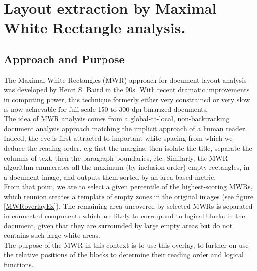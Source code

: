 \documentclass{report}
\begin{document}
\chapter{Layout extraction by Maximal White Rectangle analysis.}

\section{Approach and Purpose}
The Maximal White Rectangles (MWR) approach for document layout analysis was developed by Henri S. Baird in the 90s. With recent dramatic
improvements in computing power, this technique formerly either very constrained or very slow is now achievable for full scale 150 to
300 dpi binarized documents.\\

The idea of MWR analysis comes from a global-to-local, non-backtracking document analysis approach matching the implicit approach of a human
reader. Indeed, the eye is first attracted to important white spacing from which we deduce the reading order. e.g first the margins, then isolate
the title, separate the columns of text, then the paragraph boundaries, etc. Similarly, the MWR algorithm enumerates all the maximum (by inclusion
order) empty rectangles, in a document image, and outputs them sorted by an area-based metric.\\

From that point, we are to select a given percentile of the highest-scoring MWRs, which reunion creates a template of empty zones in the original
images (see figure \ref{MWRoverlayEx}). The remaining area uncovered by selected MWRs is separated in connected components which are likely
to correspond to logical blocks in the document, given that they are surrounded by large empty areas but do not contains such large white areas.\\

The purpose of the MWR in this context is to use this overlay, to further on use the relative positions of the blocks to determine their reading
order and logical functions.
\end{document}
